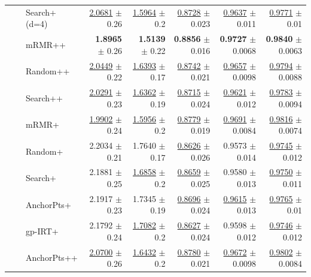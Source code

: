 \begin{longtable}{llp{}rrrrr}
 &  & Search+ (d=4) & \underline{2.0681} {\scriptsize $\pm$ 0.26} & \underline{1.5964} {\scriptsize $\pm$ 0.2} & \underline{0.8728} {\scriptsize $\pm$ 0.023} & \underline{0.9637} {\scriptsize $\pm$ 0.011} & \underline{0.9771} {\scriptsize $\pm$ 0.01} \\
 &  & mRMR++ & \textbf{1.8965} {\scriptsize $\pm$ 0.26} & \textbf{1.5139} {\scriptsize $\pm$ 0.22} & \textbf{0.8856} {\scriptsize $\pm$ 0.016} & \textbf{0.9727} {\scriptsize $\pm$ 0.0068} & \textbf{0.9840} {\scriptsize $\pm$ 0.0063} \\
 &  & Random++ & \underline{2.0449} {\scriptsize $\pm$ 0.22} & \underline{1.6393} {\scriptsize $\pm$ 0.17} & \underline{0.8742} {\scriptsize $\pm$ 0.021} & \underline{0.9657} {\scriptsize $\pm$ 0.0098} & \underline{0.9794} {\scriptsize $\pm$ 0.0088} \\
 &  & Search++ & \underline{2.0291} {\scriptsize $\pm$ 0.23} & \underline{1.6362} {\scriptsize $\pm$ 0.19} & \underline{0.8715} {\scriptsize $\pm$ 0.024} & \underline{0.9621} {\scriptsize $\pm$ 0.012} & \underline{0.9783} {\scriptsize $\pm$ 0.0094} \\
 &  & mRMR+ & \underline{1.9902} {\scriptsize $\pm$ 0.24} & \underline{1.5956} {\scriptsize $\pm$ 0.2} & \underline{0.8779} {\scriptsize $\pm$ 0.019} & \underline{0.9691} {\scriptsize $\pm$ 0.0084} & \underline{0.9816} {\scriptsize $\pm$ 0.0074} \\
 &  & Random+ & 2.2034 {\scriptsize $\pm$ 0.21} & 1.7640 {\scriptsize $\pm$ 0.17} & \underline{0.8626} {\scriptsize $\pm$ 0.026} & 0.9573 {\scriptsize $\pm$ 0.014} & \underline{0.9745} {\scriptsize $\pm$ 0.012} \\
 &  & Search+ & 2.1881 {\scriptsize $\pm$ 0.25} & \underline{1.6858} {\scriptsize $\pm$ 0.2} & \underline{0.8659} {\scriptsize $\pm$ 0.025} & 0.9580 {\scriptsize $\pm$ 0.013} & \underline{0.9750} {\scriptsize $\pm$ 0.011} \\
 &  & AnchorPts+ & 2.1917 {\scriptsize $\pm$ 0.23} & 1.7345 {\scriptsize $\pm$ 0.19} & \underline{0.8696} {\scriptsize $\pm$ 0.024} & \underline{0.9615} {\scriptsize $\pm$ 0.013} & \underline{0.9765} {\scriptsize $\pm$ 0.01} \\
 &  & gp-IRT+ & 2.1792 {\scriptsize $\pm$ 0.24} & \underline{1.7082} {\scriptsize $\pm$ 0.2} & \underline{0.8627} {\scriptsize $\pm$ 0.024} & 0.9598 {\scriptsize $\pm$ 0.012} & \underline{0.9746} {\scriptsize $\pm$ 0.012} \\
 &  & AnchorPts++ & \underline{2.0700} {\scriptsize $\pm$ 0.26} & \underline{1.6432} {\scriptsize $\pm$ 0.2} & \underline{0.8780} {\scriptsize $\pm$ 0.021} & \underline{0.9672} {\scriptsize $\pm$ 0.0098} & \underline{0.9802} {\scriptsize $\pm$ 0.0084} \\

\end{longtable}
